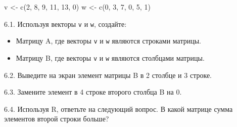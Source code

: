 \documentclass[
]{article}
\newenvironment{Shaded}{\begin{snugshade}}{\end{snugshade}}
\newcommand{\DecValTok}[1]{\textcolor[rgb]{0.00,0.00,0.81}{#1}}
\newcommand{\FunctionTok}[1]{\textcolor[rgb]{0.00,0.00,0.00}{#1}}
\newcommand{\NormalTok}[1]{#1}
\newcommand{\OtherTok}[1]{\textcolor[rgb]{0.56,0.35,0.01}{#1}}
\begin{document}
\begin{Shaded}
\begin{Highlighting}[]
\NormalTok{v }\OtherTok{\textless{}{-}} \FunctionTok{c}\NormalTok{(}\DecValTok{2}\NormalTok{, }\DecValTok{8}\NormalTok{, }\DecValTok{9}\NormalTok{, }\DecValTok{11}\NormalTok{, }\DecValTok{13}\NormalTok{, }\DecValTok{0}\NormalTok{)}
\NormalTok{w }\OtherTok{\textless{}{-}} \FunctionTok{c}\NormalTok{(}\DecValTok{0}\NormalTok{, }\DecValTok{3}\NormalTok{, }\DecValTok{7}\NormalTok{, }\DecValTok{0}\NormalTok{, }\DecValTok{5}\NormalTok{, }\DecValTok{1}\NormalTok{)}
\end{Highlighting}
\end{Shaded}

6.1. Используя векторы \texttt{v} и \texttt{w}, создайте:

\begin{itemize}
\item
  Матрицу A, где векторы \texttt{v} и \texttt{w} являются строками
  матрицы.
\item
  Матрицу B, где векторы \texttt{v} и \texttt{w} являются столбцами
  матрицы.
\end{itemize}

6.2. Выведите на экран элемент матрицы B в 2 столбце и 3 строке.

6.3. Замените элемент в 4 строке второго столбца B на 0.

6.4. Используя R, ответьте на следующий вопрос. В какой матрице сумма
элементов второй строки больше?
\end{document}
